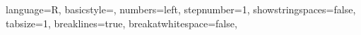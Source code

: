   
\newcommand{\smat}[1]{\brac{\begin{smallmatrix} #1 \end{smallmatrix}}}

\newcommand{\bmat}[1]{\begin{bmatrix} #1 \end{bmatrix}}

\newcommand{\pmat}[1]{\begin{pmatrix} #1 \end{pmatrix}}

\newcommand\numberthis{\addtocounter{equation}{1}\tag{\theequation}}

\newcommand{\eeq}[2][]{\begin{equation} \label{Eq:#1} #2 \end{equation}}

\newcommand{\eqq}[2][]{\begin{equation*} #2 \end{equation*}}


\usepackage{listings} %
\lstset
{ %
    language=R,
    basicstyle=\footnotesize,
    numbers=left,
    stepnumber=1,
    showstringspaces=false,
    tabsize=1,
    breaklines=true,
    breakatwhitespace=false,
}

\def\bma{\begin{pmatrix}}
\def\ema{\end{pmatrix}}

